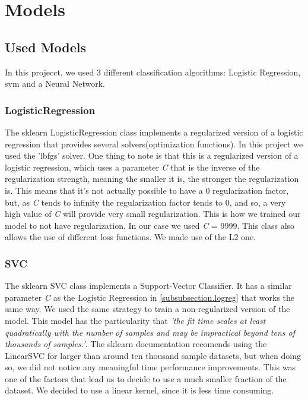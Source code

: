 \documentclass[12pt]{article}
\begin{document}
\clearpage
\section{Models}
\label{section.models}

\subsection{Used Models}
\label{subsection.used_models}
In this projecct, we used 3 different classification algorithms: Logistic Regression, \ac{svm} and a Neural Network.
\subsubsection{LogisticRegression}
\label{subsubsection.logreg}
    \par 
        The sklearn LogisticRegression\cite{logisticRegression} class implements a regularized version of a logistic regression that 
        provides several solvers(optimization functions). In this project we used the 'lbfgs' solver. One thing to note is that 
        this is a regularized version of a logistic regression, which uses a parameter \textit{C} that is the inverse of the 
        regularization strength, meaning the smaller it is, the stronger the regularization is. This means that it's not actually 
        possible to have a 0 regularization factor, but, as \textit{C} tends to infinity the regularization factor tends to 0, and 
        so, a very high value of \textit{C} will provide very small regularization. This is how we trained our model to not have regularization. 
        In our case we used \textit{C} = 9999\cite{loss_functions}. This class also allows the use of different loss functions. We made use of 
        the L2\cite{loss_functions} one.

\subsubsection{SVC}
\label{subsubsection.svc}
    \par 
        The sklearn SVC\cite{SVC} class implements a Support-Vector Classifier. It has a similar parameter \textit{C} as the Logistic Regression in 
        \autoref{subsubsection.logreg} that works the same way. We used the same strategy to train a non-regularized version of the model. This model has 
        the particularity that \textit{'the fit time scales at least quadratically with the number of samples and may be impractical beyond tens of thousands 
        of samples.'}\cite{SVC}. The sklearn documentation recomends using the LinearSVC\cite{LinearSVC} for larger than around ten thousand sample datasets, 
        but when doing so, we did not notice any meaningful time performance improvements. This was one of the factors that lead us to decide to use a much 
        smaller fraction of the dataset. We decided to use a linear kernel, since it is less time consuming\cite{kcheck}.
\end{document}
